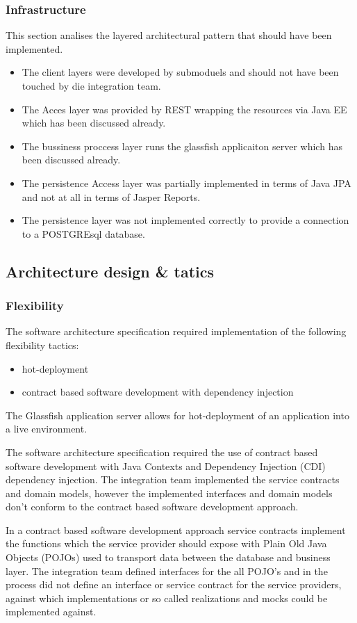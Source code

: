 \documentclass[a4paper,10pt]{article}
\begin{document}
\subsubsection{Infrastructure}
This section analises the layered architectural pattern that should have been implemented. 
\begin{itemize}
	\item The client layers were developed by submoduels and should not have been touched by die integration team.
	\item The Acces layer was provided by REST wrapping the resources via Java EE which has been discussed already.
	\item The bussiness proccess layer runs the glassfish applicaiton server which has been discussed already.
	\item The persistence Access layer was partially implemented in terms of Java JPA and not at all in terms of Jasper Reports.
	\item The persistence layer was not implemented correctly to provide a connection to a POSTGREsql database.
\end{itemize}

\subsection{Architecture design \& tatics}
\subsubsection{Flexibility}
The software architecture specification required implementation of the following flexibility tactics:
\begin{itemize}
	\item hot-deployment
	\item contract based software development with dependency injection
\end{itemize}
	
The Glassfish application server allows for hot-deployment of an application into a live environment.

The software architecture specification required the use of contract based software development with Java Contexts and Dependency Injection (CDI) dependency injection.  The integration team implemented the service contracts and domain models, however the implemented interfaces and domain models don't conform to the contract based software development approach.

In a contract based software development approach service contracts implement the functions which the service provider should expose with Plain Old Java Objects (POJOs) used to transport data between the database and business layer.  The integration team defined interfaces for the all POJO's and in the process did not define an interface or service contract for the service providers, against which implementations or so called realizations and mocks could be implemented against.
\end{document}
